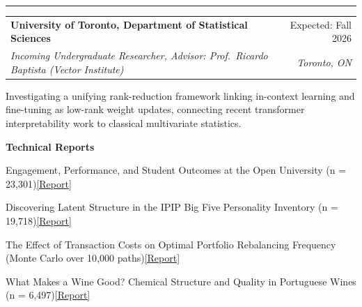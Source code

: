\documentclass[letterpaper,10pt]{article}
\makeatletter
\newcommand{\Section}[1]{\vspace{4pt}{\large\bfseries #1}\vspace{1pt}\hrule\vspace{3pt}}
\newcommand{\entry}[4]{%
  \vspace{2pt}%
  \begin{tabular*}{\textwidth}{@{}l@{\extracolsep{\fill}}r@{}}
    \textbf{#1} & #2 \\
    \textit{#3} & \textit{#4} \\
  \end{tabular*}\vspace{-4pt}}
\newenvironment{bullets}%
  {\begin{list}{\textbullet}{%
     \setlength{\leftmargin}{1.3em}\setlength{\labelsep}{0.5em}%
     \setlength{\itemsep}{1.5pt}\setlength{\topsep}{2pt}%
     \setlength{\parsep}{0pt}\setlength{\partopsep}{0pt}}}%
  {\end{list}}
\makeatother
\begin{document}
\Section{Research}
\entry{University of Toronto, Department of Statistical Sciences}{Expected: Fall 2026}%
      {Incoming Undergraduate Researcher, Advisor: Prof.\ Ricardo Baptista (Vector Institute)}{Toronto, ON}
\begin{bullets}
  \item Investigating a unifying rank-reduction framework linking in-context learning and fine-tuning as low-rank weight updates, connecting recent transformer interpretability work to classical multivariate statistics.
\end{bullets}
\vspace{3pt}
\textbf{Technical Reports}
\begin{bullets}
  \item Engagement, Performance, and Student Outcomes at the Open University (n = 23{,}301)\quad\href{https://avi-gobrin.github.io/personal-site/assets/oulad-sta437.pdf}{[Report]}
  \item Discovering Latent Structure in the IPIP Big Five Personality Inventory (n = 19{,}718)\quad\href{https://avi-gobrin.github.io/personal-site/assets/big-five-sta437.pdf}{[Report]}
  \item The Effect of Transaction Costs on Optimal Portfolio Rebalancing Frequency (Monte Carlo over 10{,}000 paths)\quad\href{https://avi-gobrin.github.io/personal-site/assets/apm-project.pdf}{[Report]}
  \item What Makes a Wine Good? Chemical Structure and Quality in Portuguese Wines (n = 6{,}497)\quad\href{https://avi-gobrin.github.io/personal-site/assets/wine-quality-sta437.pdf}{[Report]}
\end{bullets}
\end{document}
